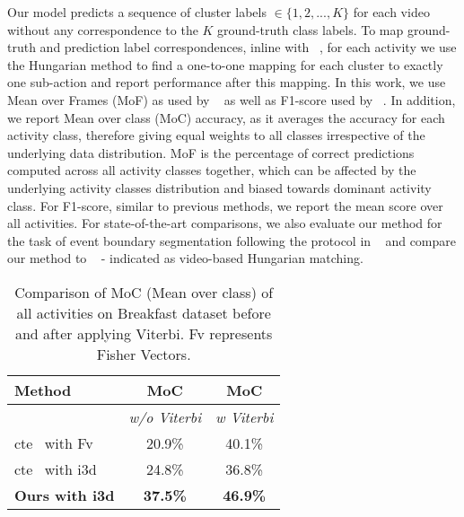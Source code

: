 \documentclass[final]{cvpr}
\begin{document}
 Our model predicts a sequence of cluster labels $ \in \{1,2,...,K\}$ for each video without any correspondence %
to the $K$ ground-truth class labels. To map ground-truth and prediction label correspondences, inline with ~\cite{Alayrac16unsupervised, sener2018unsupervised, kukleva2019unsupervised}, for each activity we use the Hungarian method to find a one-to-one mapping for each cluster to exactly one sub-action and report performance after this mapping. 
In this work, we use Mean over Frames (MoF) as used by ~\cite{sener2018unsupervised,kukleva2019unsupervised} as well as F1-score used by ~\cite{Alayrac16unsupervised}. In addition,  we report Mean over class (MoC) accuracy,  as it averages the accuracy for each activity class, therefore giving equal weights to all classes irrespective of the underlying data distribution. MoF is the percentage of correct predictions computed across all activity classes together, which can be affected by the underlying activity classes distribution and biased towards dominant activity class. For F1-score, similar to previous methods, we  report the mean score over all activities. For state-of-the-art comparisons, we also evaluate our method for the task of event boundary segmentation following the protocol in ~\cite{aakur2019perceptual} and compare our method to ~\cite{aakur2019perceptual} - indicated as video-based Hungarian matching. 


\begin{table}[t]
\vspace{-0.2cm}
    \caption{{\small Comparison of MoC (Mean over class) of all activities on Breakfast dataset before and after applying Viterbi. {\sc Fv} represents Fisher Vectors.}}
    \label{tab:avg_acc}
    \centering
    \small
    \begin{tabular}{lcc}
        \toprule
        {\bf Method} & {\bf MoC} & {\bf MoC}\\
        \midrule
         & \textit{w/o Viterbi} & \textit{w Viterbi} \\
         \midrule
        {\sc cte}~\cite{kukleva2019unsupervised} with {\sc Fv} & 20.9\% & 40.1\% \\
        {\sc cte}~\cite{kukleva2019unsupervised} with {\sc i3d} & 24.8\% & 36.8\% \\
        \midrule
        \textbf{Ours with {\sc i3d}} & \textbf{37.5\%} &\textbf{46.9\%} \\
        \bottomrule
    \end{tabular}
\end{table}
\end{document}
